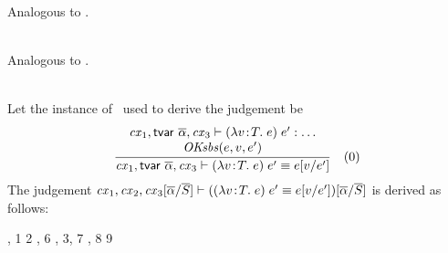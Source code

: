 \begin{bycase}
\Case{\Rthax}\\
Analogous to \Reop.

\Case{\Rthifsbs}\\
Analogous to \Reif.

\Case{\Rthabs}\\
Let the instance of \Rthabs\ used to derive the judgement be
\[
\frac{\begin{array}{c}\mathit{cx}_1,\mathsf{tvar}\ \overline{\alpha},\mathit{cx}_3\vdash(\lambda v\!:\!T.\;e)\;e':\ldots\\\mathit{OKsbs}(e,v,e')\end{array}}{\mathit{cx}_1,\mathsf{tvar}\ \overline{\alpha},\mathit{cx}_3\vdash(\lambda v\!:\!T.\;e)\;e'\equiv e[v/e']}\quad\mbox{(0)}
\]
The judgement
$\mathit{cx}_1,\mathit{cx}_2,\mathit{cx}_3[\overline{\alpha}/\overline{S}]\vdash((\lambda v\!:\!T.\;e)\;e'\equiv e[v/e'])[\overline{\alpha}/\overline{S}]$
is derived as follows:
\begin{derivation}
     {\indhyp, 1}
     {2}
     {, }
     {6}
     {\Rthabs, 3, 7}
     {, 8}
     {9}
\end{derivation}


\end{bycase}
